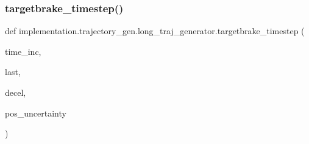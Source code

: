 \subsubsection{\texorpdfstring{targetbrake\+\_\+timestep()}{targetbrake\_timestep()}}
{\footnotesize\ttfamily def implementation.\+trajectory\+\_\+gen.\+long\+\_\+traj\+\_\+generator.\+targetbrake\+\_\+timestep (\begin{DoxyParamCaption}\item[{}]{time\+\_\+inc,  }\item[{}]{last,  }\item[{}]{decel,  }\item[{}]{pos\+\_\+uncertainty }\end{DoxyParamCaption})}

